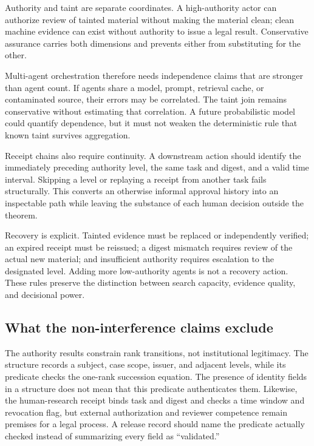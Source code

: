 Authority and taint are separate coordinates. A high-authority actor can authorize review of tainted material without making the material clean; clean machine evidence can exist without authority to issue a legal result. Conservative assurance carries both dimensions and prevents either from substituting for the other.

Multi-agent orchestration therefore needs independence claims that are stronger than agent count. If agents share a model, prompt, retrieval cache, or contaminated source, their errors may be correlated. The taint join remains conservative without estimating that correlation. A future probabilistic model could quantify dependence, but it must not weaken the deterministic rule that known taint survives aggregation.

Receipt chains also require continuity. A downstream action should identify the immediately preceding authority level, the same task and digest, and a valid time interval. Skipping a level or replaying a receipt from another task fails structurally. This converts an otherwise informal approval history into an inspectable path while leaving the substance of each human decision outside the theorem.

Recovery is explicit. Tainted evidence must be replaced or independently verified; an expired receipt must be reissued; a digest mismatch requires review of the actual new material; and insufficient authority requires escalation to the designated level. Adding more low-authority agents is not a recovery action. These rules preserve the distinction between search capacity, evidence quality, and decisional power.

\subsection{What the non-interference claims exclude}

The authority results constrain rank transitions, not institutional legitimacy. The  structure records a subject, case scope, issuer, and adjacent levels, while its  predicate checks the one-rank succession equation. The presence of identity fields in a structure does not mean that this predicate authenticates them. Likewise, the human-research receipt binds task and digest and checks a time window and revocation flag, but external authorization and reviewer competence remain premises for a legal process. A release record should name the predicate actually checked instead of summarizing every field as ``validated.''

